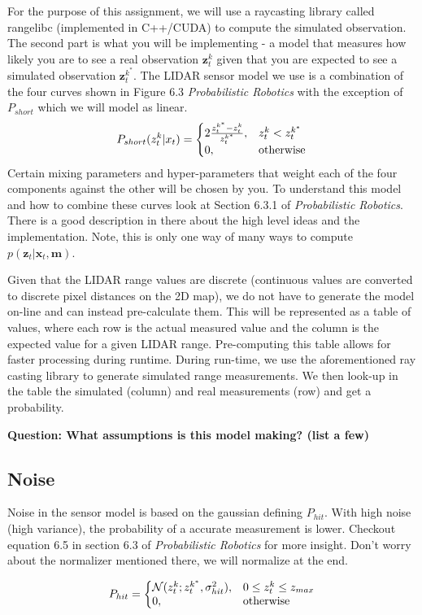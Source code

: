 \documentclass[final]{article}
\begin{document}
For the purpose of this assignment, we will use a raycasting library called rangelibc (implemented in C++/CUDA) to compute the simulated observation. The second part is what you will be implementing - a model that measures how likely you are to see a real observation $\mathbf{z}^k_t$ given that you are expected to see a simulated observation $\mathbf{z}_t^{k^*}$. The LIDAR sensor model we use is a combination of the four curves shown in Figure 6.3 \textit{Probabilistic Robotics} with the exception of \(P_{short}\) which we will model as linear. 
\[
P_{short}(z_t^k | x_t) = \left\{
\begin{array}{@{}ll@{}}
2\frac{z_t^{k^*} - z_t^k}{z_t^{k^*}}, & z_t^k < z_t^{k^*}\\
0, &\text{otherwise}
\end{array}\right.
\]
Certain mixing parameters and hyper-parameters that weight each of the four components against the other will be chosen by you. To understand this model and how to combine these curves look at Section 6.3.1 of \textit{Probabilistic Robotics}. There is a good description in there about the high level ideas and the implementation. Note, this is only one way of many ways to compute $p(\mathbf{z}_t | \mathbf{x}_t,\mathbf{m})$.

Given that the LIDAR range values are discrete (continuous values are converted to discrete pixel distances on the 2D map), we do not have to generate the model on-line and can instead pre-calculate them. This will be represented as a table of values, where each row is the actual measured value and the column is the expected value for a given LIDAR range. Pre-computing this table allows for faster processing during runtime. During run-time, we use the aforementioned ray casting library to generate simulated range measurements. We then look-up in the table the simulated (column) and real measurements (row) and get a probability.

\textbf{Question: What assumptions is this model making? (list a few)}
\subsection{Noise}
Noise in the sensor model is based on the gaussian defining \(P_{hit}\). With high noise (high variance), the probability of a accurate measurement is lower. Checkout equation 6.5 in section 6.3 of \textit{Probabilistic Robotics} for more insight. Don't worry about the normalizer mentioned there, we will normalize at the end.

\[
P_{hit}=\left\{
\begin{array}{@{}ll@{}}
\mathcal{N}(z_t^k;z_t^{k^*},\sigma_{hit}^2), & 0 \leq z_t^k \leq z_{max}\\
0, &\text{otherwise}
\end{array}\right.
\]
\end{document}

